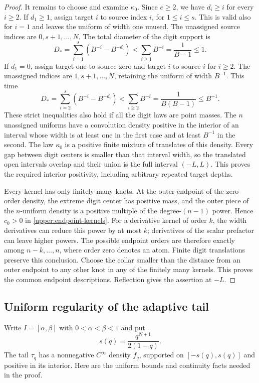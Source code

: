 \documentclass[11pt,letterpaper]{article}
\theoremstyle{definition}
\theoremstyle{remark}
\begin{document}
\begin{proof}
It remains to choose and examine $\kappa_0$.  Since $e\ge2$, we have
$d_i\ge i$ for every $i\ge2$.  If $d_1\ge1$, assign target $i$ to source
index $i$, for $1\le i\le s$.  This is valid also for $i=1$ and leaves
the uniform of width one unused.  The unassigned source indices are
$0,s+1,\ldots,N$.  The total diameter of the digit support is
\[
 D_* =\sum_{i=1}^s(B^{-i}-B^{-d_i})
       <\sum_{i\ge1}B^{-i}=\frac1{B-1}\le1.
\]
If $d_1=0$, assign target one to source zero and target $i$ to source $i$
for $i\ge2$.  The unassigned indices are $1,s+1,\ldots,N$, retaining
the uniform of width $B^{-1}$.  This time
\[
 D_* =\sum_{i=2}^s(B^{-i}-B^{-d_i})
       <\sum_{i\ge2}B^{-i}=\frac1{B(B-1)}\le B^{-1}.
\]
These strict inequalities also hold if all the digit laws are point masses.
The $n$ unassigned uniforms have a convolution density positive in the
interior of an interval whose width is at least one in the first case and
at least $B^{-1}$ in the second.  The law $\kappa_0$ is a positive finite
mixture of translates of this density.  Every gap between digit centers
is smaller than that interval width, so the translated open intervals
overlap and their union is the full interval $(-L,L)$.  This proves the
required interior positivity, including arbitrary repeated target depths.

Every kernel has only finitely many knots.  At the outer endpoint of the
zero-order density, the extreme digit center has positive mass, and the
outer piece of the $n$-uniform density is a positive multiple of the
degree-$(n-1)$ power.  Hence $c_0>0$ in
\eqref{upper:endpoint-kernels}.  For a derivative kernel of order $k$,
the width derivatives can reduce this power by at most $k$; derivatives of
the scalar prefactor can leave higher powers.  The possible endpoint
orders are therefore exactly among $n-k,\ldots,n$, where order zero
denotes an atom.  Finite digit translations preserve this conclusion.
Choose the collar smaller than the distance from an outer endpoint to any
other knot in any of the finitely many kernels.  This proves the common
endpoint descriptions.  Reflection gives the assertion at $-L$.
\end{proof}

\subsection{Uniform regularity of the adaptive tail}

Write $I=[\alpha,\beta]$ with $0<\alpha<\beta<1$ and put
\[
 s(q)=\frac{q^{N+1}}{2(1-q)}.
\]
The tail $\tau_q$ has a nonnegative $C^\infty$ density $f_q$, supported on
$[-s(q),s(q)]$ and positive in its interior.  Here are the uniform bounds
and continuity facts needed in the proof.
\end{document}
